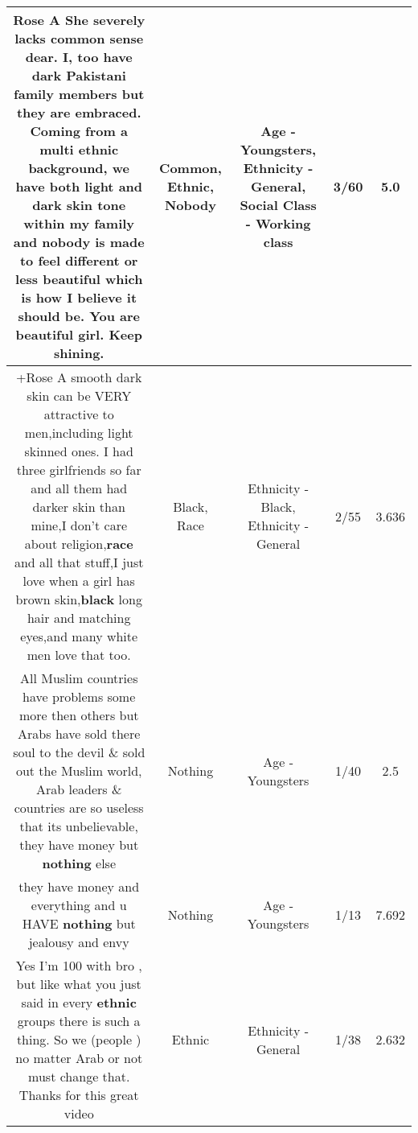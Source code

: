 \documentclass[11pt]{article}
\newlength\mylength
\begin{document}
\begin{center}
\begin{longtable}{|C{.65\mylength}|C{.30\mylength}|C{.12\mylength}|C{.12\mylength}|C{.12\mylength}|}
  \small Rose A She severely lacks \textbf{common} sense dear. I, too have dark Pakistani family members but  they are embraced. Coming from a multi \textbf{ethnic} background, we have both light and dark skin tone within my family and \textbf{nobody} is made to feel different or less beautiful which is how I believe it should be. You are beautiful girl. Keep shining.\normalsize   & Common, Ethnic, Nobody & Age - Youngsters, Ethnicity - General, Social Class - Working class & 3/60 & 5.0 \\  \hline
  \small +Rose A smooth dark skin can be VERY attractive to men,including light skinned ones. I had three girlfriends so far and all them had darker skin than mine,I don't care about religion,\textbf{race} and all that stuff,I just love when a girl has brown skin,\textbf{black} long hair and matching eyes,and many white men love that too.\normalsize   & Black, Race & Ethnicity - Black, Ethnicity - General & 2/55 & 3.636 \\  \hline
  \small All Muslim countries have problems some more then others but Arabs have sold there soul to the devil \& sold out the Muslim world, Arab leaders \& countries are so useless that its unbelievable, they have money but \textbf{nothing} else\normalsize   & Nothing & Age - Youngsters & 1/40 & 2.5 \\  \hline
  \small they have money and everything and u HAVE \textbf{nothing} but jealousy and envy\normalsize   & Nothing & Age - Youngsters & 1/13 & 7.692 \\  \hline
  \small Yes I'm 100 with bro , but like what you just said in every \textbf{ethnic} groups there is such a thing. So we (people ) no matter Arab or not must change that. Thanks for this great video\normalsize   & Ethnic & Ethnicity - General & 1/38 & 2.632 \\  \hline

\end{longtable}
\end{center}
\end{document}
